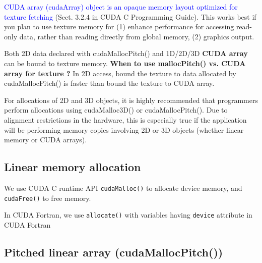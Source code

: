 
\textcolor{blue}{CUDA array (cudaArray) object is an opaque memory layout
optimized for texture fetching} (Sect. 3.2.4 in CUDA C Programming Guide). This
works best if you plan to use  texture memory for (1) enhance performance for
accessing read-only data,  rather than reading directly from global memory, (2)
graphics output. 

Both 2D data declared with cudaMallocPitch() and 1D/2D/3D {\bf CUDA
array} can be bound to texture memory. {\bf When to use mallocPitch() vs. CUDA
array for texture ?} In 2D access, bound the texture to data allocated by
cudaMallocPitch() is faster than bound the texture to CUDA array.
% 


For allocations of 2D and 3D objects, it is highly recommended that programmers
perform allocations using cudaMalloc3D() or cudaMallocPitch(). Due to alignment
restrictions in the hardware, this is especially true if the application will be
performing memory copies involving 2D or 3D objects (whether linear memory or CUDA arrays).  

\subsection{Linear memory allocation}
\label{sec:linear-memory-alloc}

We use CUDA C runtime API \verb!cudaMalloc()! to allocate device memory, and
\verb!cudaFree()! to free memory.

In CUDA Fortran, we use \verb!allocate()! with variables having \verb!device!
attribute in CUDA Fortran


\subsection{Pitched linear array (cudaMallocPitch())}
\label{sec:pitched_lineararray}

